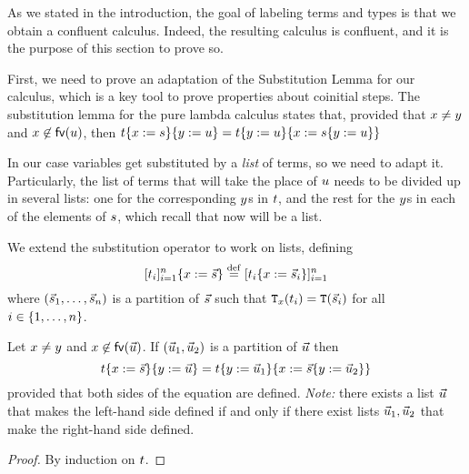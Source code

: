 As we stated in the introduction, the goal of labeling terms and types
is that we obtain a confluent calculus. Indeed, the resulting calculus
is confluent, and it is the purpose of this section to prove so.


First, we need to prove an adaptation of the Substitution Lemma for our calculus,
which is a key tool to prove properties about coinitial steps.
The substitution lemma for the pure lambda calculus \cite[Lemma 2.1.16]{Barendregt:1984}  states that, provided that
$x \neq y$ and $x \not\in \mathsf{fv}({u})$, then
  $t\{x := s\}\{y := u\} =
    t\{y := u\}\{x := s\{y := u\}\}$

In our case variables get substituted by a \emph{list} of terms, so we need to adapt it.
Particularly, the list of terms that will take the place of $u$ needs to be
divided up in several lists: one for the corresponding $y$s in $t$, and the rest
for the $y$s in each of the elements of $s$, which recall that now will be a list.

\begin{notation}
We extend the substitution operator to work on lists,
defining
\[[t_i]_{i=1}^{n}\{x := \vec{s}\} \overset{\mathrm{def}}{=} [t_i\{x := \vec{s}_i\}]_{i=1}^{n}\]
where $(\vec{s}_1,\hdots,\vec{s}_n)$ is a partition of $\vec{s}$
such that $\mathtt{T}_{x}(t_i) = \mathtt{T}(\vec{s}_i)$ for all $i \in \{1,\hdots,n\}$.
\end{notation}

\begin{lemma}
Let $x \neq y$ and $x \not\in \mathsf{fv}({\vec{u}})$.
If $(\vec{u}_1,\vec{u}_2)$ is a partition of $\vec{u}$
then
\[
  t\{x := \vec{s}\}\{y := \vec{u}\}
  =
  t\{y := \vec{u}_1\}\{x := \vec{s}\{y := \vec{u}_2\}\}
\]
provided that both sides of the equation are defined.
{\em Note:} there exists a list $\vec{u}$ that makes the left-hand side defined
if and only if there exist lists $\vec{u}_1,\vec{u}_2$ that make the
right-hand side defined.
\end{lemma}
\begin{proof}
By induction on $t$.
\end{proof}

